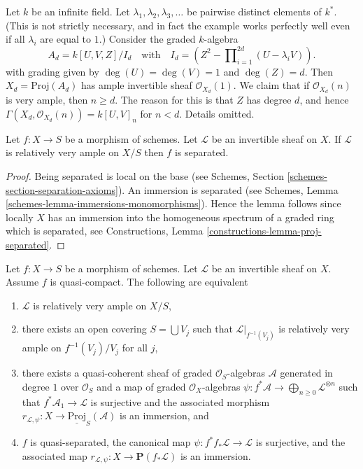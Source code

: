 \begin{example}
\label{example-not-bounded}
Let $k$ be an infinite field. Let $\lambda_1, \lambda_2, \lambda_3, \ldots$
be pairwise distinct elements of $k^*$. (This is not strictly necessary,
and in fact the example works perfectly well even if all $\lambda_i$
are equal to $1$.)
Consider the graded $k$-algebra
$$
A_d = k[U, V, Z]/I_d
\quad
\text{with}
\quad
I_d = (Z^2 - \prod\nolimits_{i = 1}^{2d} (U - \lambda_i V)).
$$
with grading given by $\deg(U) = \deg(V) = 1$ and $\deg(Z) = d$.
Then $X_d = \text{Proj}(A_d)$ has ample invertible sheaf
$\mathcal{O}_{X_d}(1)$. We claim that if $\mathcal{O}_{X_d}(n)$
is very ample, then $n \geq d$. The reason for this is that $Z$
has degree $d$, and hence $\Gamma(X_d, \mathcal{O}_{X_d}(n)) = 
k[U, V]_n$ for $n < d$. Details omitted.
\end{example}

\begin{lemma}
\label{lemma-relatively-very-ample-separated}
Let $f : X \to S$ be a morphism of schemes.
Let $\mathcal{L}$ be an invertible sheaf on $X$.
If $\mathcal{L}$ is relatively very ample on $X/S$ then
$f$ is separated.
\end{lemma}

\begin{proof}
Being separated is local on the base (see
Schemes, Section \ref{schemes-section-separation-axioms}).
An immersion is separated
(see Schemes, Lemma \ref{schemes-lemma-immersions-monomorphisms}).
Hence the lemma follows since locally $X$ has an immersion into
the homogeneous spectrum of a graded ring which is separated, see
Constructions, Lemma \ref{constructions-lemma-proj-separated}.
\end{proof}

\begin{lemma}
\label{lemma-relatively-very-ample}
Let $f : X \to S$ be a morphism of schemes.
Let $\mathcal{L}$ be an invertible sheaf on $X$.
Assume $f$ is quasi-compact. The following are
equivalent
\begin{enumerate}
\item $\mathcal{L}$ is relatively very ample on $X/S$,
\item there exists an open covering $S = \bigcup V_j$ such
that $\mathcal{L}|_{f^{-1}(V_j)}$ is relatively very ample
on $f^{-1}(V_j)/V_j$ for all $j$,
\item there exists a quasi-coherent sheaf of graded
$\mathcal{O}_S$-algebras $\mathcal{A}$ generated in degree
$1$ over $\mathcal{O}_S$ and a map of graded $\mathcal{O}_X$-algebras
$\psi : f^*\mathcal{A} \to \bigoplus_{n \geq 0} \mathcal{L}^{\otimes n}$
such that $f^*\mathcal{A}_1 \to \mathcal{L}$ is surjective and the
associated morphism
$r_{\mathcal{L}, \psi} : X \to \underline{\text{Proj}}_S(\mathcal{A})$
is an immersion, and
\item $f$ is quasi-separated, the canonical map
$\psi : f^*f_*\mathcal{L} \to \mathcal{L}$ is surjective, and
the associated map $r_{\mathcal{L}, \psi} : X \to \mathbf{P}(f_*\mathcal{L})$
is an immersion.
\end{enumerate}
\end{lemma}

